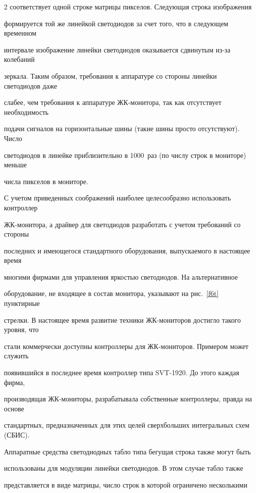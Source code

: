 \begin{multicols}{2}
соответствует одной строке матрицы пикселов. Следующая строка изображения 

формируется той же линейкой светодиодов за счет того, что в следующем временном 

интервале изображение линейки светодиодов оказывается сдвинутым из-за колебаний 

зеркала. Таким образом, требования к аппаратуре со стороны линейки светодиодов даже 

слабее, чем требования к аппаратуре ЖК-монитора, так как отсутствует необходимость 

подачи сигналов на горизонтальные шины (такие шины просто отсутствуют). Число 

светодиодов в линейке приблизительно в 1000~раз (по числу строк в мониторе) меньше 

числа пикселов в мониторе. 

  

  С учетом приведенных соображений наиболее целесообразно использовать контроллер 

ЖК-мо\-ни\-то\-ра, а драйвер для светодиодов разработать с учетом требований со стороны 

последних и име\-юще\-го\-ся стандартного оборудования, выпускаемого в настоящее время 

многими фирмами для управ\-ле\-ния яркостью светодиодов. На альтернативное 

оборудование, не входящее в состав монитора, указывают на рис.~\ref{f6t} пунктирные 

стрелки. В настоящее время развитие техники ЖК-мониторов достигло такого уровня, что 

стали коммерчески доступны контроллеры для ЖК-мониторов. Примером может служить 

появившийся в последнее время контроллер типа SVT-1920. До этого каждая фирма, 

производящая ЖК-мониторы, разрабатывала собственные контроллеры, правда на основе 

стандартных, предназначенных для этих целей сверхбольших интегральных схем (СБИС). 

  

  Аппаратные средства светодиодных табло типа бегущая строка также могут быть 

использованы для модуляции линейки светодиодов. В этом случае табло также 

представляется в виде матрицы, число строк в которой ограничено несколькими 


\end{multicols}
